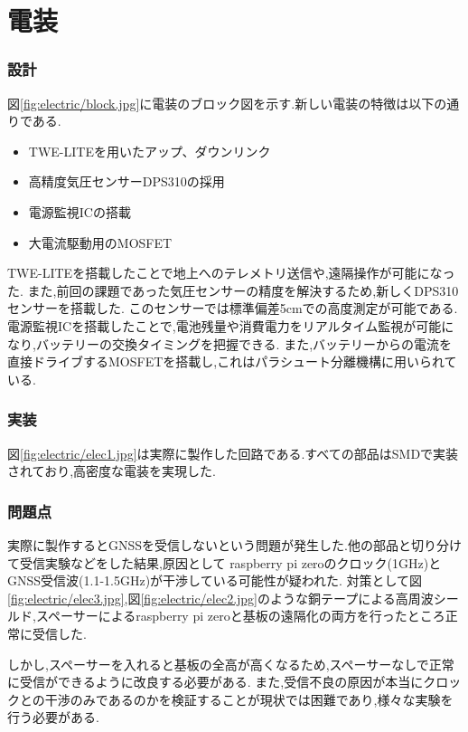 \part*{電装}
\section{設計}
図\ref{fig:electric/block.jpg}に電装のブロック図を示す.新しい電装の特徴は以下の通りである.
\begin{itemize}
\item TWE-LITEを用いたアップ、ダウンリンク
\item 高精度気圧センサーDPS310の採用
\item 電源監視ICの搭載
\item 大電流駆動用のMOSFET
\end{itemize}
TWE-LITEを搭載したことで地上へのテレメトリ送信や,遠隔操作が可能になった.
また,前回の課題であった気圧センサーの精度を解決するため,新しくDPS310センサーを搭載した.
このセンサーでは標準偏差5\si{\cm}での高度測定が可能である.
電源監視ICを搭載したことで,電池残量や消費電力をリアルタイム監視が可能になり,バッテリーの交換タイミングを把握できる.
また,バッテリーからの電流を直接ドライブするMOSFETを搭載し,これはパラシュート分離機構に用いられている.
\vfill\null
\section{実装}
図\ref{fig:electric/elec1.jpg}は実際に製作した回路である.すべての部品はSMDで実装されており,高密度な電装を実現した.
\section{問題点}
実際に製作するとGNSSを受信しないという問題が発生した.他の部品と切り分けて受信実験などをした結果,原因として
raspberry pi zeroのクロック(1\si{\GHz})とGNSS受信波(1.1-1.5\si{\GHz})が干渉している可能性が疑われた.
対策として図\ref{fig:electric/elec3.jpg},図\ref{fig:electric/elec2.jpg}のような銅テープによる高周波シールド,スペーサーによるraspberry pi zeroと基板の遠隔化の両方を行ったところ正常に受信した.
\columnbreak
{}

しかし,スペーサーを入れると基板の全高が高くなるため,スペーサーなしで正常に受信ができるように改良する必要がある.
また,受信不良の原因が本当にクロックとの干渉のみであるのかを検証することが現状では困難であり,様々な実験を行う必要がある.